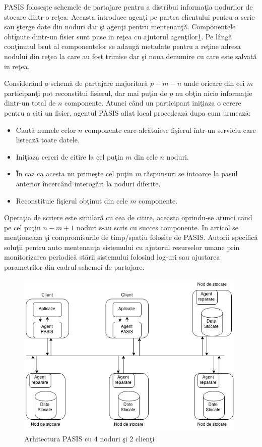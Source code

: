 \documentclass{llncs}
\begin{document}
PASIS folose\c{s}te schemele de partajare pentru a distribui informa\c{t}ia nodurilor de stocare dintr-o re\c{t}ea. Aceasta introduce agen\c{t}i pe partea clientului pentru a scrie sau \c{s}terge date din noduri dar \c{s}i agen\c{t}i pentru mentenan\c{t}\u{a}. Componentele obt\c{i}nute dintr-un fisier sunt puse in re\c{t}ea cu ajutorul agen\c{t}ilor\ref{fig:pasis}. Pe l\^{a}ng\u{a} con\c{t}inutul brut al componentelor se adaug\u{a} metadate pentru a re\c{t}ine adresa nodului din re\c{t}ea la care au fost trimise dar \c{s}i noua denumire cu care este salvat\u{a} in re\c{t}ea.

Consider\u{a}nd o schem\u{a} de partajare majoritar\u{a} $p-m-n$ unde oricare din cei $m$ participan\c{t}i pot reconstitui fisierul, dar mai pu\c{t}in de $p$ nu ob\c{t}in nicio informa\c{t}ie dintr-un total de $n$ componente. Atunci c\^{a}nd un participant ini\c{t}iaza o cerere pentru a citi un fisier, agentul PASIS aflat local procedeaz\u{a} dupa cum urmeaz\u{a}:
\begin{itemize}
	\item Caut\u{a} numele celor $n$ componente care alc\u{a}tuiesc fi\c{s}ierul \^{i}ntr-un serviciu care listeaz\u{a} toate datele.
	\item Ini\c{t}iaza cereri de citire la cel pu\c{t}in $m$ din cele $n$ noduri.
	\item \^{I}n caz ca acesta nu prime\c{s}te cel pu\c{t}in $m$ r\u{a}spunsuri se intoarce la pasul anterior \^{i}ncerc\^{a}nd interog\u{a}ri la noduri diferite.
	\item Reconstituie fi\c{s}ierul ob\c{t}inut din cele $m$ componente.
\end{itemize}
Opera\c{t}ia de scriere este similar\u{a} cu cea de citire, aceasta oprindu-se atunci cand pe cel pu\c{t}in $n - m + 1$ noduri s-au scris cu succes componente.
In articol se men\c{t}ioneaza \c{s}i compromisurile de timp/spatiu folosite de PASIS. Autorii specific\u{a} solu\c{t}ii pentru auto mentenan\c{t}a sistemului cu ajutorul resurselor umane prin monitorizarea periodic\u{a} st\u{a}rii sistemului folosind log-uri sau ajustarea parametrilor din cadrul schemei de partajare.

\begin{figure}
	\includegraphics[width=11cm]{img/PASIS.png}
	\caption{Arhitectura PASIS cu $4$ noduri \c{s}i $2$ clien\c{t}i}
	\label{fig:pasis}
	\bigskip
\end{figure}
\end{document}
